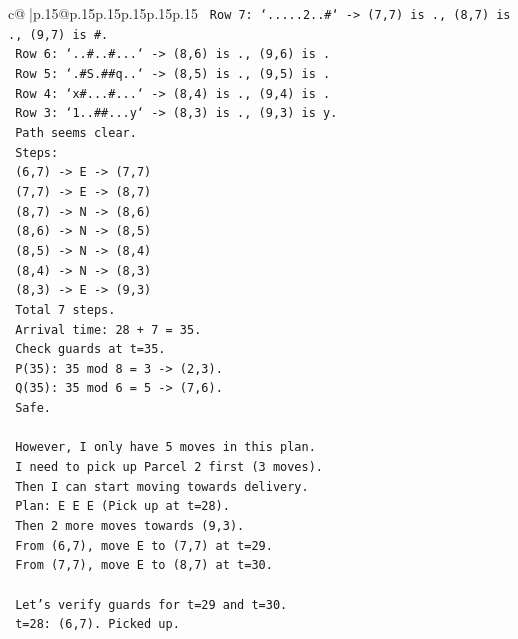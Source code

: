 \documentclass{article}
\begin{document}
{\begin{supertabular}{c@{$\;$}|p{.15\linewidth}@{}p{.15\linewidth}p{.15\linewidth}p{.15\linewidth}p{.15\linewidth}p{.15\linewidth}}
{{{\texttt{   Row 7: `.....2..\#` {-}> (7,7) is ., (8,7) is ., (9,7) is \#.} \\
\texttt{   Row 6: `..\#..\#...` {-}> (8,6) is ., (9,6) is .} \\
\texttt{   Row 5: `.\#S.\#\#q..` {-}> (8,5) is ., (9,5) is .} \\
\texttt{   Row 4: `x\#...\#...` {-}> (8,4) is ., (9,4) is .} \\
\texttt{   Row 3: `1..\#\#...y` {-}> (8,3) is ., (9,3) is y.} \\
\texttt{   Path seems clear.} \\
\texttt{   Steps:} \\
\texttt{   (6,7) {-}> E {-}> (7,7)} \\
\texttt{   (7,7) {-}> E {-}> (8,7)} \\
\texttt{   (8,7) {-}> N {-}> (8,6)} \\
\texttt{   (8,6) {-}> N {-}> (8,5)} \\
\texttt{   (8,5) {-}> N {-}> (8,4)} \\
\texttt{   (8,4) {-}> N {-}> (8,3)} \\
\texttt{   (8,3) {-}> E {-}> (9,3)} \\
\texttt{   Total 7 steps.} \\
\texttt{   Arrival time: 28 + 7 = 35.} \\
\texttt{   Check guards at t=35.} \\
\texttt{   P(35): 35 mod 8 = 3 {-}> (2,3).} \\
\texttt{   Q(35): 35 mod 6 = 5 {-}> (7,6).} \\
\texttt{   Safe.} \\
\\ 
\texttt{   However, I only have 5 moves in this plan.} \\
\texttt{   I need to pick up Parcel 2 first (3 moves).} \\
\texttt{   Then I can start moving towards delivery.} \\
\texttt{   Plan: E E E (Pick up at t=28).} \\
\texttt{   Then 2 more moves towards (9,3).} \\
\texttt{   From (6,7), move E to (7,7) at t=29.} \\
\texttt{   From (7,7), move E to (8,7) at t=30.} \\
\\ 
\texttt{   Let's verify guards for t=29 and t=30.} \\
\texttt{   t=28: (6,7). Picked up.} \\
}}}
\end{supertabular}}
\end{document}
